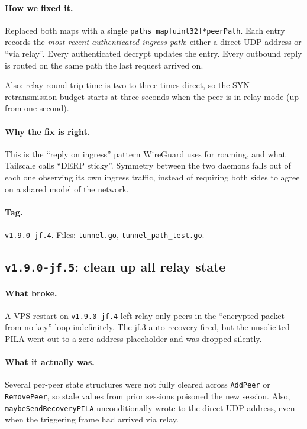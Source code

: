 \documentclass[11pt,a4paper]{article}
\begin{document}
\paragraph{How we fixed it.} Replaced both maps with a single
\texttt{paths map[uint32]*peerPath}. Each entry records the
\emph{most recent authenticated ingress path}: either a direct
UDP address or ``via relay''. Every authenticated decrypt
updates the entry. Every outbound reply is routed on the same
path the last request arrived on.

Also: relay round-trip time is two to three times direct, so the
SYN retransmission budget starts at three seconds when the peer
is in relay mode (up from one second).

\paragraph{Why the fix is right.} This is the ``reply on
ingress'' pattern WireGuard uses for roaming, and what Tailscale
calls ``DERP sticky''. Symmetry between the two daemons falls out
of each one observing its own ingress traffic, instead of
requiring both sides to agree on a shared model of the network.

\paragraph*{Tag.} \texttt{v1.9.0-jf.4}. Files: \texttt{tunnel.go},
\texttt{tunnel\_path\_test.go}.

\subsection{\texttt{v1.9.0-jf.5}: clean up all relay state}

\paragraph{What broke.} A VPS restart on
\texttt{v1.9.0-jf.4} left relay-only peers in the
``encrypted packet from no key'' loop indefinitely. The jf.3
auto-recovery fired, but the unsolicited PILA went out to a
zero-address placeholder and was dropped silently.

\paragraph{What it actually was.} Several per-peer state
structures were not fully cleared across \texttt{AddPeer} or
\texttt{RemovePeer}, so stale values from prior sessions
poisoned the new session. Also, \texttt{maybeSendRecoveryPILA}
unconditionally wrote to the direct UDP address, even when the
triggering frame had arrived via relay.
\end{document}
